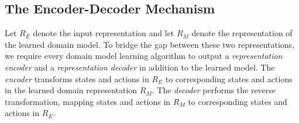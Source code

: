 \documentclass{article}
\theoremstyle{definition}
\theoremstyle{remark}
\begin{document}



\subsection{The Encoder-Decoder Mechanism}
Let $R_E$ denote the input representation and let $R_M$ denote the representation of the learned domain model. 
To bridge the gap between these two representations, we require every domain model learning algorithm to output 
a \emph{representation encoder} and a \emph{representation decoder} in addition to the learned model. 
The \emph{encoder} transforms states and actions in $R_E$ to corresponding states and actions in the learned domain representation $R_M$. 
The \emph{decoder} performs the reverse transformation, mapping states and actions in $R_M$ to corresponding states and actions in $R_E$.
\end{document}
